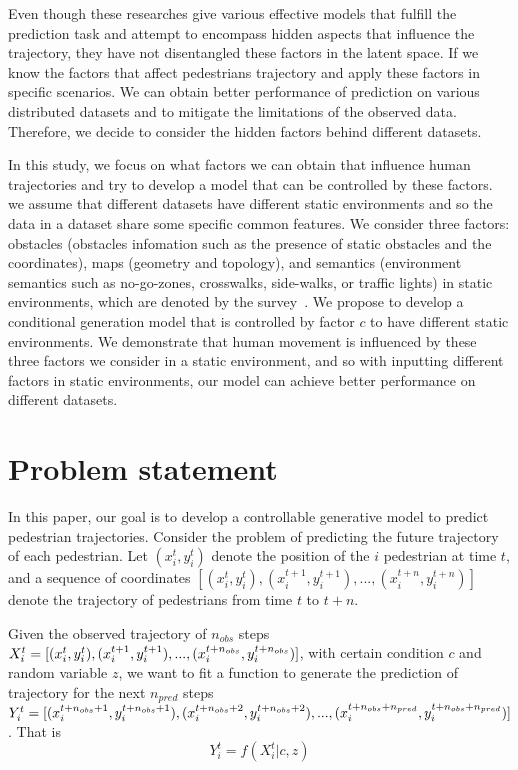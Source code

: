 \documentclass[sigconf]{acmart}
\begin{document}
Even though these researches give various effective models that fulfill the prediction task and attempt to encompass hidden aspects that influence the trajectory, they have not disentangled these factors in the latent space. If we know the factors that affect pedestrians trajectory and apply these factors in specific scenarios. We can obtain better performance of prediction on various distributed datasets and to mitigate the limitations of the observed data. Therefore, we decide to consider the hidden factors behind different datasets.

In this study, we focus on what factors we can obtain that influence human trajectories and try to develop a model that can be controlled by these factors. we assume that different datasets have different static environments and so the data in a dataset share some specific common features. We consider three factors: obstacles (obstacles infomation such as the presence of static obstacles and the coordinates), maps (geometry and topology), and semantics (environment semantics such as no-go-zones, crosswalks, side-walks, or traffic lights) in static environments, which are denoted by the survey~\cite{humanmotionsurvey}. We propose to develop a conditional generation model that is controlled by factor $c$ to have different static environments. We demonstrate that human movement is influenced by these three factors we consider in a static environment, and so with inputting different factors in static environments, our model can achieve better performance on different datasets.


\section{Problem statement}

In this paper, our goal is to develop a controllable generative model to predict pedestrian trajectories.
Consider the problem of predicting the future trajectory of each pedestrian. Let $(x_i^t, y_i^t)$ denote the position of the $i$ pedestrian at time $t$, and a sequence of coordinates  $[(x_i^{t}, y_i^{t}), (x_i^{t+1}, y_i^{t+1}), ..., (x_i^{t+n}, y_i^{t+n})]$ denote the trajectory of pedestrians from time $t$ to $t+n$.

Given the observed trajectory of $n_{obs}$ steps $X_i^t = [(x_i^{t}, y_i^{t}), \\ (x_i^{t+1}, y_i^{t+1}), ..., (x_i^{t+n_{obs}}, y_i^{t+n_{obs}})]$, with certain condition $c$ and random variable $z$,  we want to fit a function to generate the prediction of trajectory for the next $n_{pred}$ steps $Y_i^t = [(x_i^{t+n_{obs}+1}, y_i^{t+n_{obs}+1}), \\ (x_i^{t+n_{obs}+ 2}, y_i^{t+n_{obs}+2}), ...,  (x_i^{t+n_{obs}+ n_{pred}}, y_i^{t+n_{obs}+n_{pred}})]$. That is
$$ Y_i^t = f(X_i^t \vert c, z) $$
\end{document}
